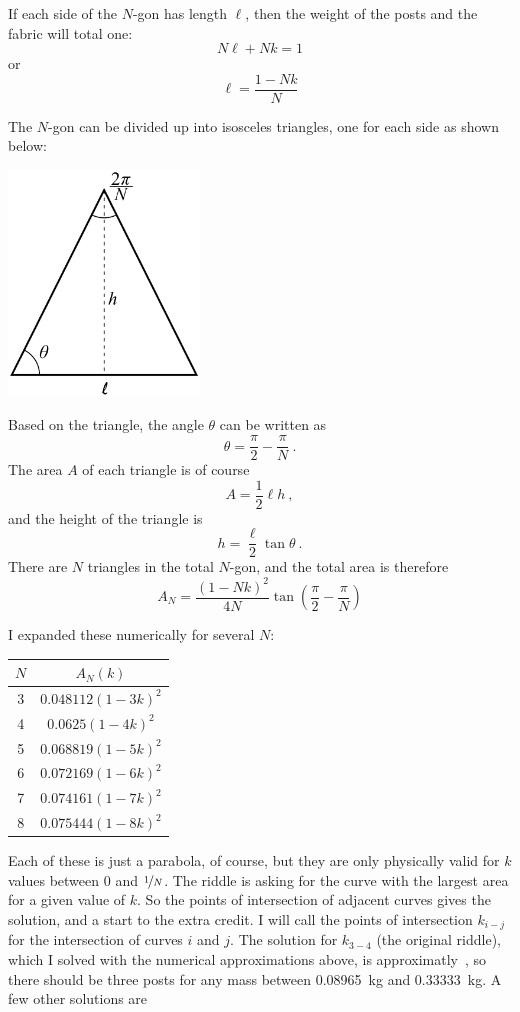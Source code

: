 \documentclass{article}
\begin{document}
If each side of the $N$-gon has length $\ell$, then the weight of the posts and the fabric will total one:
\[
N\ell+Nk=1
\]
or
\[
\ell=\frac{1-Nk}{N}
\]

The $N$-gon can be divided up into isosceles triangles, one for each side as shown below:

\vspace{0.1in}
\begin{center}
\includegraphics[width=2in]{polygon_section.pdf}
\end{center}
\vspace{0.1in}

Based on the triangle, the angle $\theta$ can be written as 
\[
\theta=\frac{\pi}{2}-\frac{\pi}{N}\ .
\]
The area $A$ of each triangle is of course
\[
A=\frac{1}{2}\ell h\ ,
\]
and the height of the triangle is
\[
h=\frac{\ell}{2}\tan\theta\ .
\]
There are $N$ triangles in the total $N$-gon, and the total area is therefore
\[
A_{N}=\frac{(1-Nk)^{2}}{4N}\tan\left(\frac{\pi}{2}-\frac{\pi}{N}\right)
\]

I expanded these numerically for several $N$:

\vspace{0.1in}
\begin{center}
\begin{tabular}{c c}
$N$ & $A_{N}(k)$ \\
\hline
3 & $0.048112(1-3k)^{2}$ \\
4 & $0.0625(1-4k)^{2}$ \\
5 & $0.068819(1-5k)^{2}$ \\
6 & $0.072169(1-6k)^{2}$ \\
7 & $0.074161(1-7k)^{2}$ \\
8 & $0.075444(1-8k)^{2}$
\end{tabular}
\end{center}
\vspace{0.1in}

Each of these is just a parabola, of course, but they are only physically valid for $k$ values between 0 and $\nicefrac{1}{N}$.
The riddle is asking for the curve with the largest area for a given value of $k$.
So the points of intersection of adjacent curves gives the solution, and a start to the extra credit.
I will call the points of intersection $k_{i-j}$ for the intersection of curves $i$ and $j$.
The solution for $k_{3-4}$ (the original riddle), which I solved with the numerical approximations above, is approximatly
\,,
so there should be three posts for any mass between 0.08965~kg and 0.33333~kg.
A few other solutions are
\end{document}

